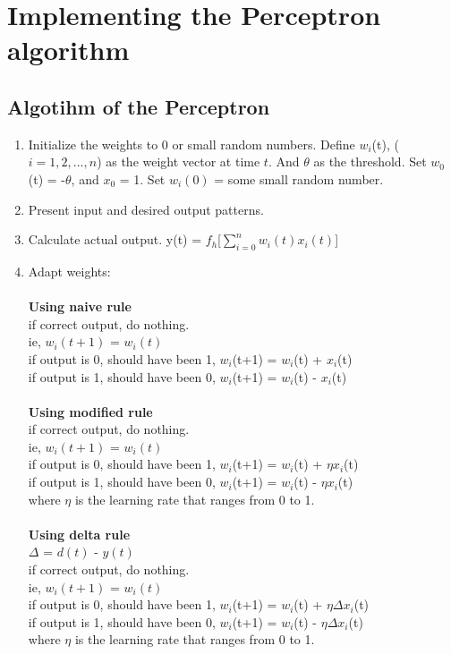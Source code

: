 \section{Implementing the Perceptron algorithm}
\subsection{Algotihm of the Perceptron}
\begin{enumerate}
    \item Initialize the weights to 0 or small random numbers.
    Define $w_i$(t), ($i = 1, 2, ..., n$) as the weight vector at time $t$. And $\theta$ as the threshold. Set $w_0$(t) = -$\theta$, and $x_0$ = 1.
    Set $w_i(0)$ = some small random number.
    \item Present input and desired output patterns.
    \item Calculate actual output.
    y(t) = $f_h$[$\sum_{i=0}^{n} w_i(t)x_i(t)$]
    \item Adapt weights:\\\\
    \textbf{Using naive rule}\\
    if correct output, do nothing.\\
    ie, $w_i(t+1)$ = $w_i(t)$\\
    if output is 0, should have been 1, $w_i$(t+1) = $w_i$(t) + $x_i$(t)\\
    if output is 1, should have been 0, $w_i$(t+1) = $w_i$(t) - $x_i$(t)\\\\
    \textbf{Using modified rule}\\
    if correct output, do nothing.\\
    ie, $w_i(t+1)$ = $w_i(t)$\\
    if output is 0, should have been 1, $w_i$(t+1) = $w_i$(t) + $\eta x_i$(t)\\
    if output is 1, should have been 0, $w_i$(t+1) = $w_i$(t) - $\eta x_i$(t)\\
    where $\eta$ is the learning rate that ranges from 0 to 1.\\\\
    \textbf{Using delta rule}\\
    $\Delta$ = $d(t)$ - $y(t)$\\
    if correct output, do nothing.\\
    ie, $w_i(t+1)$ = $w_i(t)$\\
    if output is 0, should have been 1, $w_i$(t+1) = $w_i$(t) + $\eta \Delta x_i$(t)\\
    if output is 1, should have been 0, $w_i$(t+1) = $w_i$(t) - $\eta \Delta x_i$(t)\\
    where $\eta$ is the learning rate that ranges from 0 to 1.\\\\
\end{enumerate}
